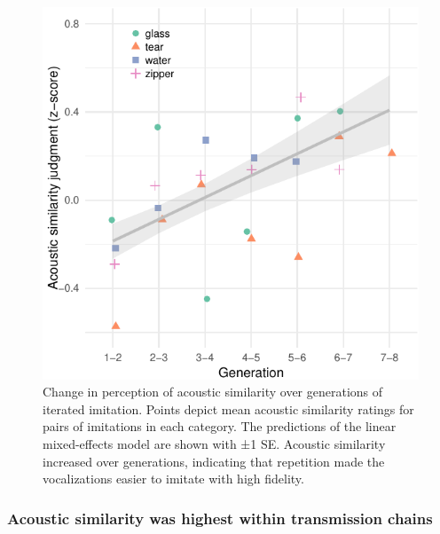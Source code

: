 \documentclass[english,floatsintext,man]{apa6}
\theoremstyle{definition}
\theoremstyle{definition}
\theoremstyle{definition}
\theoremstyle{remark}
\begin{document}
\begin{figure}
\centering
\includegraphics{fig2-1.pdf}
\caption{\label{fig:fig2}Change in perception of acoustic similarity over
generations of iterated imitation. Points depict mean acoustic
similarity ratings for pairs of imitations in each category. The
predictions of the linear mixed-effects model are shown with ±1 SE.
Acoustic similarity increased over generations, indicating that
repetition made the vocalizations easier to imitate with high fidelity.}
\end{figure}

\hypertarget{acoustic-similarity-was-highest-within-transmission-chains}{%
\subsubsection{Acoustic similarity was highest within transmission
chains}\label{acoustic-similarity-was-highest-within-transmission-chains}}
\end{document}
